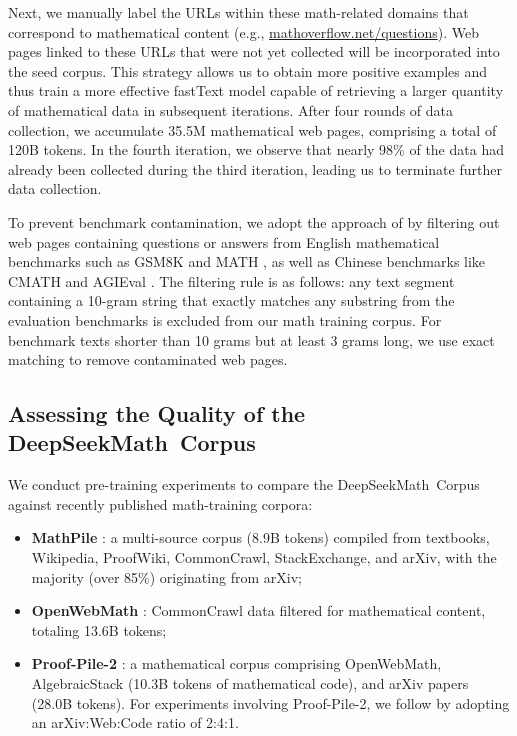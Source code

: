 Next, we manually label the URLs within these math-related domains that correspond to mathematical content (e.g., \url{mathoverflow.net/questions}). Web pages linked to these URLs that were not yet collected will be incorporated into the seed corpus. This strategy allows us to obtain more positive examples and thus train a more effective fastText model capable of retrieving a larger quantity of mathematical data in subsequent iterations. After four rounds of data collection, we accumulate 35.5M mathematical web pages, comprising a total of 120B tokens. In the fourth iteration, we observe that nearly 98\% of the data had already been collected during the third iteration, leading us to terminate further data collection.

To prevent benchmark contamination, we adopt the approach of \cite{deepseek-coder} by filtering out web pages containing questions or answers from English mathematical benchmarks such as GSM8K \citep{gsm8k} and MATH \citep{MATH}, as well as Chinese benchmarks like CMATH \citep{wei2023cmath} and AGIEval \citep{agieval}. The filtering rule is as follows: any text segment containing a 10-gram string that exactly matches any substring from the evaluation benchmarks is excluded from our math training corpus. For benchmark texts shorter than 10 grams but at least 3 grams long, we use exact matching to remove contaminated web pages.

\subsection{Assessing the Quality of the DeepSeekMath~Corpus}

We conduct pre-training experiments to compare the DeepSeekMath~Corpus against recently published math-training corpora:

\begin{itemize}[topsep=0pt]
    \item \textbf{MathPile} \citep{mathpile}: a multi-source corpus (8.9B tokens) compiled from textbooks, Wikipedia, ProofWiki, CommonCrawl, StackExchange, and arXiv, with the majority (over 85\%) originating from arXiv;
    \item \textbf{OpenWebMath} \citep{openwebmath}: CommonCrawl data filtered for mathematical content, totaling 13.6B tokens;
    \item \textbf{Proof-Pile-2} \citep{llemma}: a mathematical corpus comprising OpenWebMath, AlgebraicStack (10.3B tokens of mathematical code), and arXiv papers (28.0B tokens). For experiments involving Proof-Pile-2, we follow \cite{llemma} by adopting an arXiv:Web:Code ratio of 2:4:1.
\end{itemize}

